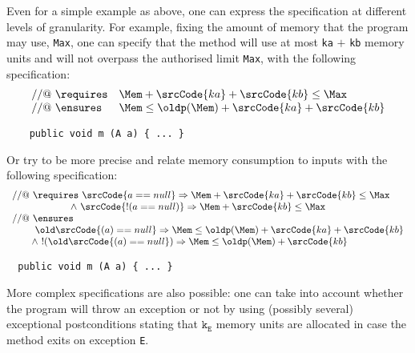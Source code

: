 Even for a simple example as above, one can express the specification
at different levels of granularity. For example, fixing the amount of
memory that the program may use, \verb!Max!, one can specify that the
method will use at most \verb!ka! $+$ \verb!kb! memory units and will not
overpass the authorised limit \verb!Max!, with the following
specification:
$$
\begin{array}{ll}
//@ \ \requires & \Mem + \srcCode{ka} + \srcCode{kb} \leq \Max \\
//@ \ \ensures &  \Mem \leq \oldp(\Mem) + \srcCode{ka} + \srcCode{kb}     
\end{array}
$$
\begin{verbatim}
    public void m (A a) { ... }
\end{verbatim}
Or try to be more precise and relate memory consumption to inputs with
the following specification:
$$
\begin{array}{l}
//@ \ \requires \ \srcCode{a==null} \Rightarrow \Mem + \srcCode{ka} + \srcCode{kb} \leq \Max \\ 
\ \ \ \ \ \ \ \ \ \ \ \ \ \ \ \ \ \ \land \ \srcCode{!(a==null)} \Rightarrow \Mem + \srcCode{kb} \leq \Max \\
//@ \ \ensures \\
\ \ \ \ \ \ \   \old\srcCode{(a)==null} \Rightarrow \Mem \leq \oldp(\Mem) + \srcCode{ka} + \srcCode{kb} \\ 
\ \ \ \ \ \ \land \ !(\old\srcCode{(a)==null}) \Rightarrow \Mem \leq \oldp(\Mem) + \srcCode{kb}    
\end{array}
$$
\begin{verbatim}
  public void m (A a) { ... }
\end{verbatim}
More complex specifications are also possible: one can
take into account whether the program will throw an exception or not by
using (possibly several) exceptional postconditions stating that
$\texttt{k}_{\texttt{E}}$ memory units are allocated in case the
method exits on exception \texttt{E}.

